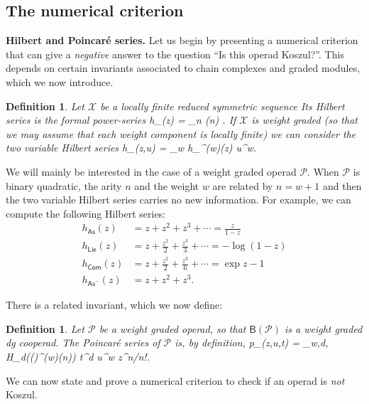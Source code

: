 \documentclass[fleqn, a4paper, twoside]{article}
\makeatletter
\newcommand{\0}{\langle 0\rangle}
\newcommand{\XX}{\mathcal{X}}
\newcommand{\B}[1]{\mathsf{B}(#1)}
\let\[\@undefined
\DeclareRobustCommand{\[}{\begin{equation}}%
\let\]\@undefined
\DeclareRobustCommand{\]}{\end{equation}}%
\theoremstyle{mytheorem}
\theoremstyle{introthm}
\theoremstyle{mydefinition}
\newtheorem{definition}[theorem]{Definition}
\theoremstyle{mydefinition2}
\theoremstyle{plain} %
\newcommand{\As}{\mathsf{As}}
\newcommand{\Com}{\mathsf{Com}}
\newcommand{\Lie}{\mathsf{Lie}}
\newcommand{\?}{\,?\,}
\newcommand{\PP}{{\mathcal{P}}}
\theoremstyle{mytheorem}
\theoremstyle{plain} %
\makeatother
\begin{document}
\subsection{The numerical criterion}

\textbf{Hilbert and Poincar\'e series.} Let us begin
by presenting a numerical criterion that can give a \emph{negative}
answer to the question ``Is this operad Koszul?''. This
depends on certain invariants associated to chain complexes
and graded modules, which we now introduce.

\begin{definition}
Let $\XX$ be a locally finite reduced symmetric sequence
Its \emph{Hilbert series} is the formal power-series
\[
h_\XX(z) = \sum_{n} \dim \XX(n) .
\]
If $\XX$ is weight graded (so that we may assume that each
weight component is locally finite) we can consider the two
variable Hilbert series
 \[
h_\XX(z,u) = \sum_{w} h_{\XX^{(w)}}(z) u^w.
\]
\end{definition}

We will mainly be interested in the case of a weight graded operad $\PP$.
When $\PP$ is binary quadratic, the arity $n$ and the weight $w$ are related
by $n = w+1$ and then the two variable Hilbert series carries no new information.
For example, we can compute the following Hilbert series:
\begin{align*}
h_{\As}(z) &=  z + z^2 + z^3 + \cdots = \frac{z}{1-z} \\
h_{\Lie}(z) &=  z + \frac {z^2}2 + \frac{z^3} 3 + \cdots =-\log(1-z) \\
h_{\Com}(z) &=  z + \frac {z^2}2 + \frac{z^3} 6  + \cdots = \exp z -1 \\
h_{\As^-}(z) &=  z +  {z^2} + z^3.
\end{align*}


There is a related invariant, which we now define:
\begin{definition} Let $\PP$ be a weight graded operad, so that
$\B{\PP}$ is a weight graded dg cooperad. The Poincar\'e series
of $\PP$ is, by definition,
\[
p_{\PP}(z,u,t) = \sum_{w,d,} \dim H_d(\B{\PP}^{(w)}(n)) t^d u^w z^n/n!.
\]
\end{definition}

We can now state and prove a numerical criterion to check if an
operad is \emph{not} Koszul.
\end{document}
